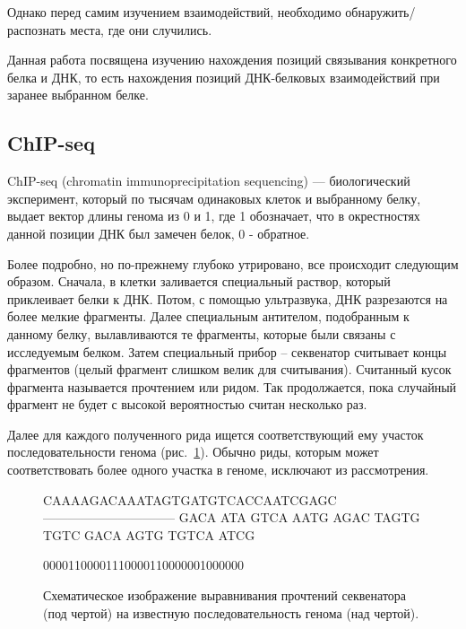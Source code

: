 \documentclass{matmex-diploma-custom}
\begin{document}
Однако перед самим изучением взаимодействий, необходимо обнаружить/распознать места, где они случились.

Данная работа посвящена изучению нахождения позиций связывания конкретного белка и ДНК, то есть нахождения позиций ДНК-белковых взаимодействий при заранее выбранном белке.

\subsection*{ChIP-seq}
ChIP-seq (chromatin immunoprecipitation sequencing) --- биологический эксперимент, который по тысячам одинаковых клеток и выбранному белку, выдает вектор длины генома из 0 и 1, где 1 обозначает, что в окрестностях данной позиции ДНК был замечен белок, 0 - обратное.

Более подробно, но по-прежнему глубоко утрировано, все происходит следующим образом. Сначала, в клетки заливается специальный раствор, который приклеивает белки к ДНК. Потом, с помощью ультразвука, ДНК разрезаются на более мелкие фрагменты. Далее специальным антителом, подобранным к данному белку, вылавливаются те фрагменты, которые были связаны с исследуемым белком. Затем специальный прибор -- секвенатор считывает концы фрагментов (целый фрагмент слишком велик для считывания). Считанный кусок фрагмента называется прочтением или ридом. 
Так продолжается, пока случайный фрагмент не будет с высокой вероятностью считан несколько раз.

Далее для каждого полученного рида ищется соответствующий
ему участок последовательности генома (рис.~\ref{fig:chip-seq}). Обычно
риды, которым может соответствовать более одного участка в геноме,
исключают из рассмотрения.

\begin{figure}[h]
  \centering

          CAAAAGACAAATAGTGATGTCACCAATCGAGC
          --------------------------------
               GACA ATA     GTCA   AATG
              AGAC   TAGTG TGTC
               GACA   AGTG TGTCA   ATCG

          00001100001110000110000001000000
  \caption{Схематическое изображение выравнивания прочтений секвенатора (под чертой)
    на известную последовательность генома (над чертой).}
  \label{fig:chip-seq}
\end{figure}
\end{document}
